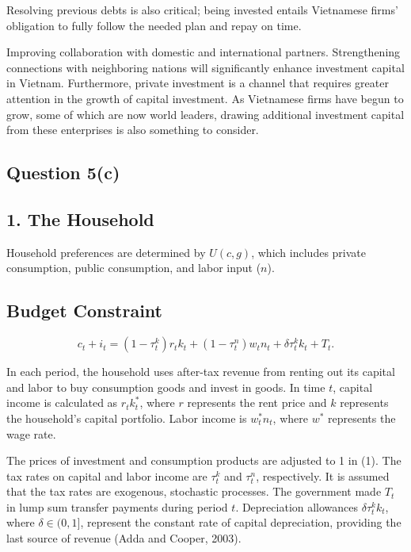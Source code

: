 \documentclass{article}
\newcommand{\subsectiontitle}[1]{\subsection*{#1}\addcontentsline{toc}{subsection}{#1}}
\begin{document}
Resolving previous debts is also critical; being invested entails Vietnamese firms' obligation to fully follow the needed plan and repay on time.

Improving collaboration with domestic and international partners.  
Strengthening connections with neighboring nations will significantly enhance investment capital in Vietnam.  
Furthermore, private investment is a channel that requires greater attention in the growth of capital investment.  
As Vietnamese firms have begun to grow, some of which are now world leaders, drawing additional investment capital from these enterprises is also something to consider.

\subsectiontitle{Question 5(c)}

\subsection*{1. The Household}

Household preferences are determined by \( U(c, g) \), which includes private consumption, public consumption, and labor input (\( n \)).


\subsection*{Budget Constraint}

\begin{equation}
    c_t + i_t = \left(1 - \tau^k_t \right) r_t k_t + \left(1 - \tau^n_t \right) w_t n_t + \delta \tau^k_t k_t + T_t.
\end{equation}

In each period, the household uses after-tax revenue from renting out its capital and labor to buy consumption goods and invest in goods. In time \( t \), capital income is calculated as \( r_t k^*_t \), where \( r \) represents the rent price and \( k \) represents the household's capital portfolio. Labor income is \( w^*_t n_t \), where \( w^* \) represents the wage rate.

The prices of investment and consumption products are adjusted to 1 in (1). The tax rates on capital and labor income are \( \tau^k_t \) and \( \tau^n_t \), respectively. It is assumed that the tax rates are exogenous, stochastic processes. The government made \( T_t \) in lump sum transfer payments during period \( t \). Depreciation allowances \( \delta \tau^k_t k_t \), where \( \delta \in (0, 1] \), represent the constant rate of capital depreciation, providing the last source of revenue (Adda and Cooper, 2003).
\end{document}
